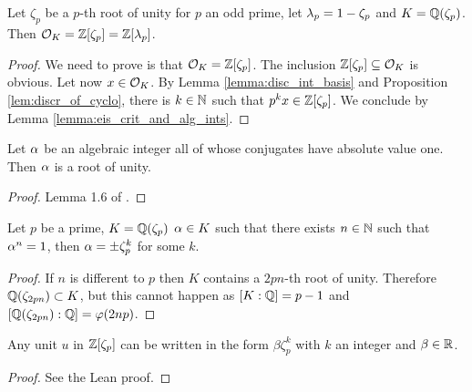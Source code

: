 \begin{theorem}\label{theorem:ring_of_ints_of_cyclo}
	\leanok
	Let $\zeta_p$ be a $p$-th root of unity for $p$ an odd prime, let $\lambda_p=1-\zeta_p$ and $K=\mathbb{Q}(\zeta_p)$. Then $\mathcal{O}_K=\mathbb{Z}[\zeta_p]=\mathbb{Z}[\lambda_p]$.
\end{theorem}
\begin{proof}
	\leanok
	We need to prove is that $\mathcal{O}_K=\mathbb{Z}[\zeta_p]$. The inclusion $\mathbb{Z}[\zeta_p] \subseteq \mathcal{O}_K$ is obvious. Let now $x \in \mathcal{O}_K$. By Lemma \ref{lemma:disc_int_basis} and Proposition \ref{lem:discr_of_cyclo}, there is $k \in \mathbb{N}$ such that $p^k x \in \mathbb{Z}[\zeta_p]$. We conclude by Lemma \ref{lemma:eis_crit_and_alg_ints}.
\end{proof}

\begin{lemma}\label{lemma:alg_int_abs_val_one}
	\leanok
	Let $\alpha$ be an algebraic integer all of whose conjugates have absolute value one. Then $\alpha$ is a root of unity.
\end{lemma}
\begin{proof}
	\leanok
	Lemma 1.6 of \cite{washington}.
\end{proof}


\begin{lemma}\label{lem:roots_of_unity_in_cyclo}
	\leanok
	Let $p$ be a prime, $K=\mathbb{Q}(\zeta_p)$ $\alpha \in K$ such that there exists $n \in \mathbb{N}$ such that $\alpha^n=1$, then $\alpha =\pm \zeta_p^k$ for some $k$.
\end{lemma}
\begin{proof}
	\leanok
	If $n$ is different to $p$ then $K$ contains a $2pn$-th root of unity. Therefore $\mathbb{Q}(\zeta_{2pn}) \subset K$, but this cannot happen as $[K : \mathbb{Q}]=p-1$ and $[\mathbb{Q}(\zeta_{2pn}): \mathbb{Q} ] = \varphi(2np)$.
\end{proof}

\begin{lemma}\label{lemma:unit_lemma}
	\leanok
	Any unit $u$ in $\mathbb{Z}[\zeta_p]$ can be written in the form $\beta \zeta_p^k  $ with $k$ an integer and $\beta \in \mathbb{R}$.
\end{lemma}
\begin{proof}
	\leanok
	See the Lean proof.
\end{proof}

